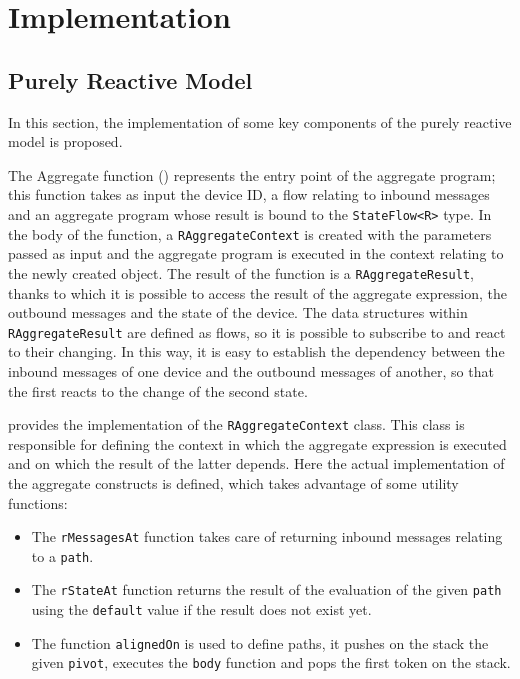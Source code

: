 
\chapter{Implementation}
\label{chap:implementation}

\section{Purely Reactive Model}

In this section, the implementation of some key components of the purely reactive model is proposed.

The Aggregate function () represents the entry point of the aggregate program; this function takes as input the device ID, a flow relating to inbound messages and an aggregate program whose result is bound to the \texttt{StateFlow<R>} type. In the body of the function, a \texttt{RAggregateContext} is created with the parameters passed as input and the aggregate program is executed in the context relating to the newly created object. The result of the function is a \texttt{RAggregateResult}, thanks to which it is possible to access the result of the aggregate expression, the outbound messages and the state of the device. The data structures within \texttt{RAggregateResult} are defined as flows, so it is possible to subscribe to and react to their changing. In this way, it is easy to establish the dependency between the inbound messages of one device and the outbound messages of another, so that the first reacts to the change of the second state.

 provides the implementation of the \texttt{RAggregateContext} class. This class is responsible for defining the context in which the aggregate expression is executed and on which the result of the latter depends. Here the actual implementation of the aggregate constructs is defined, which takes advantage of some utility functions:

\begin{itemize}
    \item The \texttt{rMessagesAt} function takes care of returning inbound messages relating to a \texttt{path}.
    \item The \texttt{rStateAt} function returns the result of the evaluation of the given \texttt{path} using the \texttt{default} value if the result does not exist yet.
    \item The function \texttt{alignedOn} is used to define paths, it pushes on the stack the given \texttt{pivot}, executes the \texttt{body} function and pops the first token on the stack.
\end{itemize}

